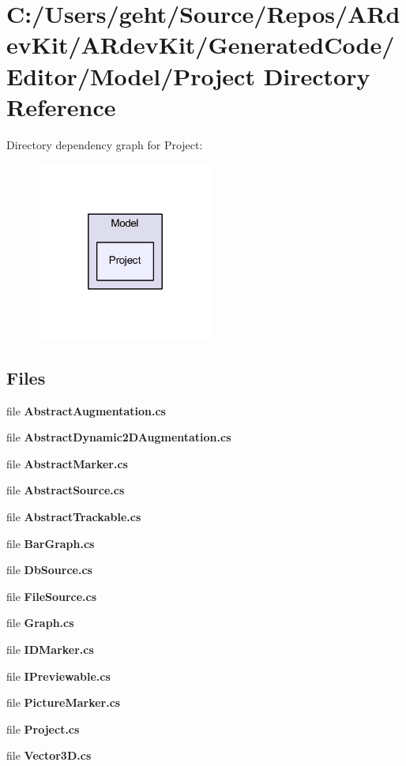 \section{C\-:/\-Users/geht/\-Source/\-Repos/\-A\-Rdev\-Kit/\-A\-Rdev\-Kit/\-Generated\-Code/\-Editor/\-Model/\-Project Directory Reference}
\label{dir_e109bc9719b3993cb227bc5b1f408d6b}
Directory dependency graph for Project\-:
\nopagebreak
\begin{figure}[H]
\begin{center}
\leavevmode
\includegraphics[width=166pt]{dir_e109bc9719b3993cb227bc5b1f408d6b_dep}
\end{center}
\end{figure}
\subsection*{Files}
\begin{DoxyCompactItemize}
\item 
file {\bfseries Abstract\-Augmentation.\-cs}
\item 
file {\bfseries Abstract\-Dynamic2\-D\-Augmentation.\-cs}
\item 
file {\bfseries Abstract\-Marker.\-cs}
\item 
file {\bfseries Abstract\-Source.\-cs}
\item 
file {\bfseries Abstract\-Trackable.\-cs}
\item 
file {\bfseries Bar\-Graph.\-cs}
\item 
file {\bfseries Db\-Source.\-cs}
\item 
file {\bfseries File\-Source.\-cs}
\item 
file {\bfseries Graph.\-cs}
\item 
file {\bfseries I\-D\-Marker.\-cs}
\item 
file {\bfseries I\-Previewable.\-cs}
\item 
file {\bfseries Picture\-Marker.\-cs}
\item 
file {\bfseries Project.\-cs}
\item 
file {\bfseries Vector3\-D.\-cs}
\end{DoxyCompactItemize}
